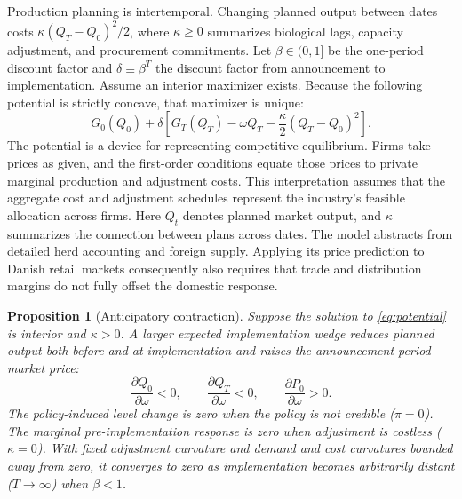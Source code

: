 \documentclass[11pt]{article}
\newtheorem{proposition}{Proposition}
\begin{document}
Production planning is intertemporal. Changing planned output between dates costs $\kappa(Q_T-Q_0)^2/2$, where $\kappa\geq0$ summarizes biological lags, capacity adjustment, and procurement commitments. Let $\beta\in(0,1]$ be the one-period discount factor and $\delta\equiv\beta^T$ the discount factor from announcement to implementation. Assume an interior maximizer exists. Because the following potential is strictly concave, that maximizer is unique:
\begin{equation}\label{eq:potential}
G_0(Q_0)+\delta\left[G_T(Q_T)-\omega Q_T-
\frac{\kappa}{2}(Q_T-Q_0)^2\right].
\end{equation}
The potential is a device for representing competitive equilibrium. Firms take prices as given, and the first-order conditions equate those prices to private marginal production and adjustment costs. This interpretation assumes that the aggregate cost and adjustment schedules represent the industry's feasible allocation across firms. Here $Q_t$ denotes planned market output, and $\kappa$ summarizes the connection between plans across dates. The model abstracts from detailed herd accounting and foreign supply. Applying its price prediction to Danish retail markets consequently also requires that trade and distribution margins do not fully offset the domestic response.

\begin{proposition}[Anticipatory contraction]\label{prop:anticipation}
Suppose the solution to \eqref{eq:potential} is interior and $\kappa>0$. A larger expected implementation wedge reduces planned output both before and at implementation and raises the announcement-period market price:
\begin{equation}
\frac{\partial Q_0}{\partial\omega}<0,
\qquad
\frac{\partial Q_T}{\partial\omega}<0,
\qquad
\frac{\partial P_0}{\partial\omega}>0.
\end{equation}
The policy-induced level change is zero when the policy is not credible ($\pi=0$). The marginal pre-implementation response is zero when adjustment is costless ($\kappa=0$). With fixed adjustment curvature and demand and cost curvatures bounded away from zero, it converges to zero as implementation becomes arbitrarily distant ($T\rightarrow\infty$) when $\beta<1$.
\end{proposition}
\end{document}

